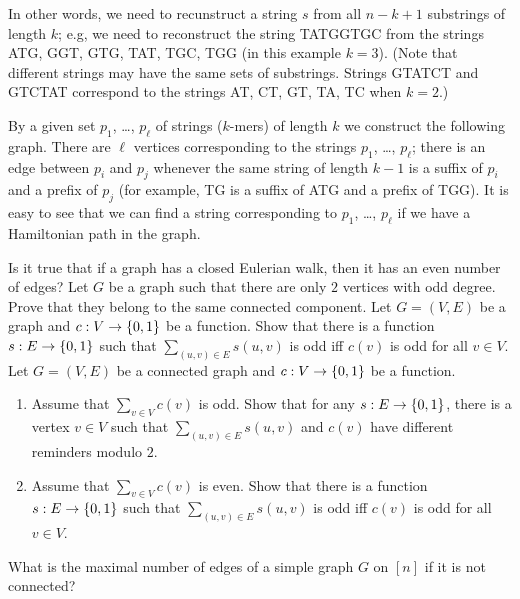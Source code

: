 In other words, we need to recunstruct a string $s$ from all $n - k + 1$
substrings of length $k$; e.g, we need to reconstruct the string TATGGTGC
from the strings ATG, GGT, GTG, TAT, TGC, TGG (in this example $k = 3$).
(Note that different strings may have the same sets of substrings.
Strings GTATCT and GTCTAT correspond to the strings
AT, CT, GT, TA, TC when $k = 2$.)

By a given set $p_1$, \dots, $p_\ell$ of strings ($k$-mers) of length $k$
we construct the following graph. There are $\ell$ vertices corresponding to
the strings $p_1$, \dots, $p_\ell$; there is an edge between $p_i$ and $p_j$
whenever the same string of length $k - 1$ is a suffix of $p_i$ and a
prefix of $p_j$ (for example, TG is a suffix of ATG and a prefix of TGG).
It is easy to see that we can find a string corresponding to
$p_1$, \dots, $p_\ell$ if we have a Hamiltonian path in the graph.

\begin{chapterendexercises}
  \exercise Is it true that if a graph has a closed Eulerian walk, then it has
    an even number of edges?
  \exercise[recommended] Let $G$ be a graph such that there are only $2$
    vertices with odd degree. Prove that they belong to the same connected
    component.
  \exercise Let $G = (V, E)$ be a graph and $c : V \to \set{0, 1}$ be a
    function. Show that there is a function $s : E \to \set{0, 1}$
    such that $\sum_{(u, v) \in E} s(u, v)$ is odd iff $c(v)$ is odd
    for all $v \in V$.
  \exercise Let $G = (V, E)$ be a connected graph and $c : V \to \set{0, 1}$
    be a function.
    \begin{enumerate}
      \item Assume that $\sum_{v \in V} c(v)$ is odd.
        Show that for any $s : E \to \set{0, 1}$, there is a vertex
        $v \in V$ such that $\sum_{(u, v) \in E} s(u, v)$ and $c(v)$
        have different reminders modulo $2$.
      \item Assume that $\sum_{v \in V} c(v)$ is even.
        Show that there is a function $s : E \to \set{0, 1}$
        such that $\sum_{(u, v) \in E} s(u, v)$ is odd iff $c(v)$ is odd
        for all $v \in V$.
    \end{enumerate}
  \exercise What is the maximal number of edges of a simple graph $G$ on $[n]$
    if it is not connected?
\end{chapterendexercises}
